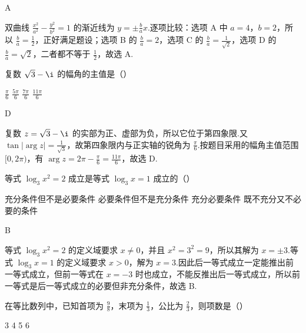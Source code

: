 \begin{answer}
A
\end{answer}

\begin{solution}
双曲线 \(\frac{x^2}{a^2}-\frac{y^2}{b^2}=1\) 的渐近线为
\(y=\pm\frac{b}{a}x\).逐项比较：选项 A 中 \(a=4\)，\(b=2\)，所以 \(\frac{b}{a}=\frac{1}{2}\)，正好满足题设；选项 B 的 \(\frac{b}{a}=2\)，选项 C 的 \(\frac{b}{a}=\frac{1}{\sqrt{2}}\)，选项 D 的 \(\frac{b}{a}=\sqrt{2}\)，二者都不等于 \(\frac{1}{2}\)，故选 A.
\end{solution}

\begin{problem}

复数 \(\sqrt{3}-\i\) 的幅角的主值是（\quad）

\choices
    {\(\frac{\pi}{6}\)}
    {\(\frac{5\pi}{6}\)}
    {\(\frac{7\pi}{6}\)}
    {\(\frac{11\pi}{6}\)}
\end{problem}

\begin{answer}
D
\end{answer}

\begin{solution}
复数 \(z=\sqrt{3}-\i\) 的实部为正、虚部为负，所以它位于第四象限.又
\(\tan|\arg z|=\frac{1}{\sqrt{3}}\)，故第四象限内与正实轴的锐角为 \(\frac{\pi}{6}\).按题目采用的幅角主值范围 \([0,2\pi)\)，有
\(\arg z=2\pi-\frac{\pi}{6}=\frac{11\pi}{6}\)，故选 D.
\end{solution}

\begin{problem}

等式 \(\log_3 x^2=2\) 成立是等式 \(\log_3 x=1\) 成立的（\quad）

\choices
    {充分条件但不是必要条件}
    {必要条件但不是充分条件}
    {充分必要条件}
    {既不充分又不必要的条件}
\end{problem}

\begin{answer}
B
\end{answer}

\begin{solution}
等式 \(\log_3x^2=2\) 的定义域要求 \(x\ne0\)，并且
\(x^2=3^2=9\)，所以其解为 \(x=\pm3\).等式 \(\log_3x=1\) 的定义域要求 \(x>0\)，解为 \(x=3\).因此后一等式成立一定能推出前一等式成立，但前一等式在 \(x=-3\) 时也成立，不能反推出后一等式成立，所以前一等式是后一等式成立的必要但非充分条件，故选 B.
\end{solution}

\begin{problem}

在等比数列中，已知首项为 \(\frac{9}{8}\)，末项为 \(\frac{1}{3}\)，公比为 \(\frac{2}{3}\)，则项数是（\quad）

\choices
    {3}
    {4}
    {5}
    {6}
\end{problem}

